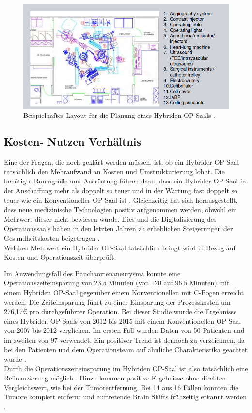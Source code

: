 \begin{figure} [t!]
	\includegraphics[scale = 0.7]{Content/Pictures/roomplanning.png}
	\caption{Beispielhaftes Layout für die Planung eines Hybriden OP-Saals \cite{HybridOR}.}
	\label{fig:roomplanning}
\end{figure}

\subsection{Kosten- Nutzen Verhältnis}

Eine der Fragen, die noch geklärt werden müssen, ist, ob ein Hybrider OP-Saal tatsächlich den Mehraufwand an Kosten und Umstrukturierung lohnt. Die benötigte Raumgröße und Ausrüstung führen dazu, dass ein Hybrider OP-Saal in der Anschaffung mehr als doppelt so teuer und in der Wartung fast doppelt so teuer wie ein Konventioneller OP-Saal ist \cite{HybridOR}. Gleichzeitig hat sich herausgestellt, dass neue medizinische Technologien positiv aufgenommen werden, obwohl ein Mehrwert dieser nicht bewiesen wurde. Dies und die Digitalisierung des Operationssaals haben in den letzten Jahren zu erheblichen Steigerungen der Gesundheitskosten beigetragen \cite{DerDigitaleOperationssaal}. \\
Welchen Mehrwert ein Hybrider OP-Saal tatsächlich bringt wird in Bezug auf Kosten und Operationszeit überprüft.

Im Anwendungsfall des Bauchaortenaneurysma konnte eine Operationszeiteinsparung von 23,5 Minuten (von 120 auf 96,5 Minuten) mit einem Hybriden OP-Saal gegenüber einem Konventionellen mit C-Bogen erreicht werden. Die Zeiteinsparung führt zu einer Einsparung der Prozesskosten um 276,17€ pro durchgeführter Operation. Bei dieser Studie wurde die Ergebnisse eines Hybriden OP-Saals von 2012 bis 2015 mit einem Konventionellen OP-Saal von 2007 bis 2012 verglichen. Im ersten Fall wurden Daten von 50 Patienten und im zweiten von 97 verwendet. Ein positiver Trend ist dennoch zu verzeichnen, da bei den Patienten und dem Operationsteam auf ähnliche Charakteristika geachtet wurde \cite{HybriderVsKonventioneller}.\\
Durch die Operationszeiteinsparung im Hybriden OP-Saal ist also tatsächlich eine Refinanzierung möglich \cite{HybriderVsKonventioneller}. Hinzu kommen positive Ergebnisse ohne direkten Vergleichswert, wie bei der Tumorentfernung. Bei 14 aus 16 Fällen konnten die Tumore komplett entfernt und auftretende Brain Shifts frühzeitig erkannt werden \cite{BrainShiftInTumorResection}.

